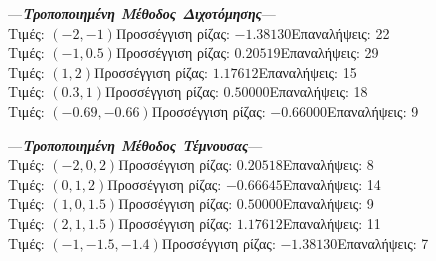 \documentclass[a4paper,11pt]{article}
\begin{document}
\begin{flushleft}
\begin{itemize}
---\emph{\textbf{Τροποποιημένη Μέθοδος Διχοτόμησης}}---\\
Τιμές: $(-2, -1)$\quad Προσσέγγιση ρίζας: $-1.38130$\quad Επαναλήψεις: 22\\
Τιμές: $(-1, 0.5)$\quad Προσσέγγιση ρίζας: $0.20519$\quad Επαναλήψεις: 29\\
Τιμές: $(1, 2)$\quad Προσσέγγιση ρίζας: $1.17612$\quad Επαναλήψεις: 15\\
Τιμές: $(0.3, 1)$\quad Προσσέγγιση ρίζας: $0.50000$\quad Επαναλήψεις: 18\\
Τιμές: $(-0.69, -0.66)$\quad Προσσέγγιση ρίζας: $-0.66000$\quad Επαναλήψεις: 9\\
\bigskip 

---\emph{\textbf{Τροποποιημένη Μέθοδος Τέμνουσας}}---\\
Τιμές: $(-2, 0, 2)$\quad Προσσέγγιση ρίζας: $0.20518$\quad 	Επαναλήψεις: 8\\
Τιμές: $(0, 1, 2)$\quad Προσσέγγιση ρίζας: $-0.66645$\quad 	Επαναλήψεις: 14\\
Τιμές: $(1, 0, 1.5)$\quad Προσσέγγιση ρίζας: $0.50000$\quad 	Επαναλήψεις: 9\\
Τιμές: $(2, 1, 1.5)$\quad Προσσέγγιση ρίζας: $1.17612$\quad 	Επαναλήψεις: 11\\
Τιμές: $(-1, -1.5, -1.4)$\quad Προσσέγγιση ρίζας: $-1.38130$\quad 	Επαναλήψεις: 7\\

	\end{itemize}
	\end{flushleft}


\end{document}
